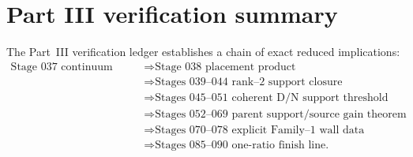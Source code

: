 \section{Part III verification summary}
\label{sec:app-part03-verification-summary}

The Part~III verification ledger establishes a chain of exact reduced implications:
\begin{equation}
\label{eq:app-part03-summary-chain}
\begin{aligned}
\text{Stage 037 continuum data}
&\Rightarrow
\text{Stage 038 placement product}
\\
&\Rightarrow
\text{Stages 039--044 rank--2 support closure}
\\
&\Rightarrow
\text{Stages 045--051 coherent D/N support threshold}
\\
&\Rightarrow
\text{Stages 052--069 parent support/source gain theorem}
\\
&\Rightarrow
\text{Stages 070--078 explicit Family--1 wall data}
\\
&\Rightarrow
\text{Stages 085--090 one-ratio finish line.}
\end{aligned}
\end{equation}

